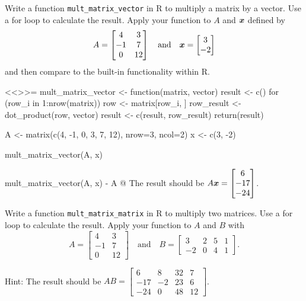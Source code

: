 \documentclass
[answers]
{exercise_sheet}
\begin{document}
\begin{Question}{2}
Write a function \verb|mult_matrix_vector| in R to multiply a matrix by a vector. Use a for loop to calculate the result. Apply your function to $A$ and $\bm{x}$ defined by
\begin{equation*}
A = 
\begin{bmatrix}
4 & 3 \\ 
-1 & 7 \\ 
0 & 12 
\end{bmatrix}
\quad
\text{and}
\quad
\bm{x} = 
\begin{bmatrix} 
3 \\ -2 
\end{bmatrix}
\end{equation*}
and then compare to the built-in functionality within R.
\end{Question}

\makeatletter\if@answers\begin{Answer}{12}
<<>>=  
mult_matrix_vector <- function(matrix, vector) {
  result <- c()
  for (row_i in 1:nrow(matrix)) {
    row <- matrix[row_i, ]
    row_result <- dot_product(row, vector)
    result <- c(result, row_result)
  }
  return(result)
}

A <- matrix(c(4, -1, 0, 3, 7, 12), nrow=3, ncol=2)
x <- c(3, -2)

mult_matrix_vector(A, x)

mult_matrix_vector(A, x) - A %
@
The result should be $A\bm{x} = \begin{bmatrix} 6 \\ -17 \\ -24 \end{bmatrix}$.
\end{Answer}\fi\makeatother

\begin{Question}{2}
Write a function \verb|mult_matrix_matrix| in R to multiply two matrices. Use a for loop to calculate the result. Apply your function to $A$ and $B$ with
\begin{equation*}
A = 
\begin{bmatrix} 
4 & 3 \\ 
-1 & 7 \\ 
0 & 12 
\end{bmatrix} 
\quad
\text{and}
\quad
B = \begin{bmatrix} 
3 & 2 & 5 & 1\\ 
-2 & 0 & 4 & 1
\end{bmatrix}
.
\end{equation*}

Hint: The result should be
$AB = \begin{bmatrix}
6 & 8 & 32 & 7 \\
-17 & -2 & 23 & 6 \\
-24 & 0 & 48 & 12
\end{bmatrix}$.

\end{Question}
\end{document}

